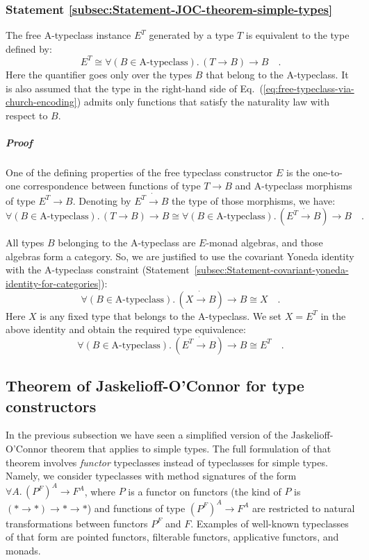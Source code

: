 \subsubsection{Statement \label{subsec:Statement-JOC-theorem-simple-types}\ref{subsec:Statement-JOC-theorem-simple-types}}

The free A-typeclass instance $E^{T}$ generated by a type $T$ is
equivalent to the type defined by:
\begin{equation}
E^{T}\cong\forall(B\in\text{A-typeclass}).\,(T\rightarrow B)\rightarrow B\quad.\label{eq:free-typeclass-via-church-encoding}
\end{equation}
Here the quantifier goes only over the types $B$ that belong to the
A-typeclass. It is also assumed that the type in the right-hand side
of Eq.~(\ref{eq:free-typeclass-via-church-encoding}) admits only
functions that satisfy the naturality law with respect to $B$.

\subparagraph{Proof}

One of the defining properties of the free typeclass constructor $E$
is the one-to-one correspondence between functions of type $T\rightarrow B$
and A-typeclass morphisms of type $E^{T}\rightarrow B$. Denoting
by $E^{T}\dot{\rightarrow}B$ the type of those morphisms, we have:
\[
\forall(B\in\text{A-typeclass}).\,(T\rightarrow B)\rightarrow B\cong\forall(B\in\text{A-typeclass}).\,(E^{T}\dot{\rightarrow}B)\rightarrow B\quad.
\]

All types $B$ belonging to the A-typeclass are $E$-monad algebras,
and those algebras form a category. So, we are justified to use the
covariant Yoneda identity with the A-typeclass constraint (Statement~\ref{subsec:Statement-covariant-yoneda-identity-for-categories}):
\[
\forall(B\in\text{A-typeclass}).\,(X\dot{\rightarrow}B)\rightarrow B\cong X\quad.
\]
Here $X$ is any fixed type that belongs to the A-typeclass. We set
$X=E^{T}$ in the above identity and obtain the required type equivalence:
\[
\forall(B\in\text{A-typeclass}).\,(E^{T}\dot{\rightarrow}B)\rightarrow B\cong E^{T}\quad.
\]


\subsection{Theorem of Jaskelioff-O\textsf{'}Connor for type constructors\label{subsec:The-Jaskelioff-OConnor-theorem}}

In the previous subsection we have seen a simplified version of the
Jaskelioff-O\textsf{'}Connor theorem that applies to simple types. The full
formulation of that theorem involves \emph{functor} typeclasses instead
of typeclasses for simple types. Namely, we consider typeclasses with
method signatures of the form $\forall A.\,(P^{F})^{A}\rightarrow F^{A}$,
where $P$ is a functor on functors (the kind of $P$ is $(*\rightarrow*)\rightarrow*\rightarrow*$)
and functions of type $(P^{F})^{A}\rightarrow F^{A}$ are restricted
to natural transformations between functors $P^{F}$ and $F$. Examples
of well-known typeclasses of that form are pointed functors, filterable
functors, applicative functors, and monads.


